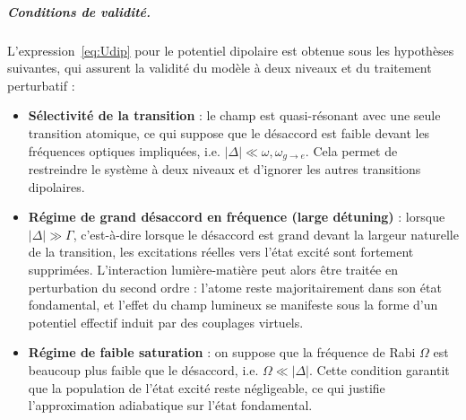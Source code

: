 \subparagraph{Conditions de validité.}

L'expression~\eqref{eq:Udip} pour le potentiel dipolaire est obtenue sous les hypothèses suivantes, qui assurent la validité du modèle à deux niveaux et du traitement perturbatif :

\begin{itemize}
  \item \textbf{Sélectivité de la transition} : le champ est quasi-résonant avec une seule transition atomique, ce qui suppose que le désaccord est faible devant les fréquences optiques impliquées, i.e. $|\Delta| \ll \omega, \omega_{\scriptstyle g \rightarrow e}$. Cela permet de restreindre le système à deux niveaux et d’ignorer les autres transitions dipolaires.
  
  \item \textbf{Régime de grand désaccord en fréquence (large détuning)} : lorsque $|\Delta| \gg \Gamma$, c’est-à-dire lorsque le désaccord est grand devant la largeur naturelle de la transition, les excitations réelles vers l’état excité sont fortement supprimées. L’interaction lumière-matière peut alors être traitée en perturbation du second ordre : l’atome reste majoritairement dans son état fondamental, et l’effet du champ lumineux se manifeste sous la forme d’un potentiel effectif induit par des couplages virtuels.
  
  \item \textbf{Régime de faible saturation} : on suppose que la fréquence de Rabi $\Omega$ est beaucoup plus faible que le désaccord, i.e. $\Omega \ll |\Delta|$. Cette condition garantit que la population de l’état excité reste négligeable, ce qui justifie l’approximation adiabatique sur l’état fondamental.
\end{itemize}





